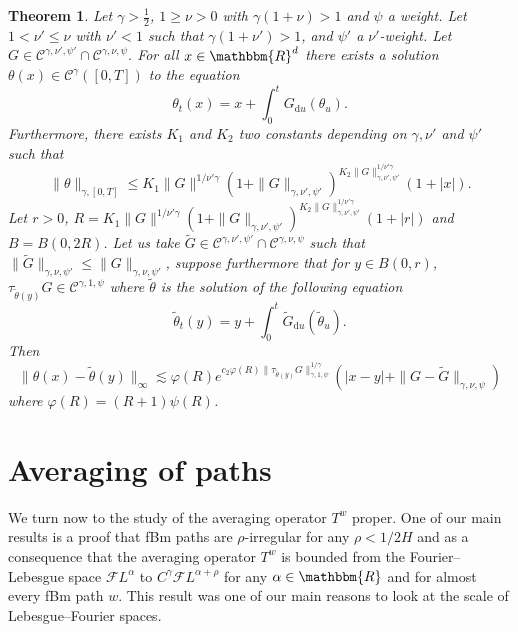 \documentclass[a4paper,11pt]{article}
\newcommand{\mathd}{\mathrm{d}}
\newtheorem{theorem}{Theorem}[section]
\newcommand{\CC}{\mathscr C}
\newcommand{\CF}{\mathscr F}
\begin{document}
\begin{theorem}
  Let $\gamma > \frac{1}{2}$, $1 \geqslant \nu >0$ with $\gamma ( 1+ \nu ) >1$
  and $\psi$ a weight. Let $1< \nu' \leqslant \nu$ with $\nu' <1$ such that
  $\gamma ( 1+ \nu' ) >1$, and $\psi'$ a $\nu'$-weight. Let $G \in \CC^{\gamma
  , \nu' , \psi'} \cap \CC^{\gamma , \nu , \psi}$. For all $x \in
  \mathbbm{R}^{d}$ there exists a solution $\theta ( x ) \in \CC^{\gamma} ( [
  0,T ] )$ to the equation
  \[ \theta_{t} ( x ) =x+ \int_{0}^{t} G_{\mathd u} ( \theta_{u} ) . \]
  Furthermore, there exists $K_{1}$ and $K_{2}$ two constants depending on
  $\gamma , \nu'$ and $\psi'$ such that
  \[ _{} \| \theta \|_{\gamma , [ 0,T ]} \leqslant K_{1} \| G \|^{1/ \nu'
     \gamma} ( 1+ \| G \|_{\gamma , \nu' , \psi'} )^{K_{2} \| G \|_{\gamma ,
     \nu' , \psi'}^{1/ \nu' \gamma}} ( 1+ | x | ) . \]
  Let $r>0$, $R=K_{1} \| G \|^{1/ \nu' \gamma} ( 1+ \| G \|_{\gamma , \nu' ,
  \psi'} )^{K_{2} \| G \|_{\gamma , \nu' , \psi'}^{1/ \nu' \gamma}} ( 1+ | r |
  )$ and $B=B ( 0,2R )$. Let us take $\tilde{G} \in \CC^{\gamma , \nu' ,
  \psi'} \cap \CC^{\gamma , \nu , \psi}$ such that $\| \tilde{G} \|_{\gamma ,
  \nu , \psi'} \leqslant \| G \|_{\gamma , \nu , \psi'}$, suppose furthermore
  that for $y \in B ( 0,r )$, $\tau_{\tilde{\theta} ( y )} G \in \CC^{\gamma
  ,1, \psi}$ where $\tilde{\theta}$ is the solution of the following equation
  \[ \tilde{\theta}_{t} ( y ) =y+ \int_{0}^{t} \tilde{G}_{\mathd u} (
     \tilde{\theta}_{u} ) . \]
  Then
  \[ \| \theta ( x ) - \tilde{\theta} ( y ) \|_{\infty} \lesssim \varphi ( R )
     e^{c_{2} \varphi ( R ) \| \tau_{\tilde{\theta} ( y )} G \|_{\gamma ,1,
     \psi}^{1/ \gamma}} ( | x-y | + \| G- \tilde{G} \|_{\gamma , \nu , \psi} )
  \]
  where $\varphi ( R ) = ( R+1 ) \psi ( R )$.
\end{theorem}

\section{Averaging of paths}\label{sec:averaging_deterministic}

We turn now to the study of the averaging operator $T^{w}$ proper. One of our
main results is a proof that fBm paths are $\rho$-irregular for any $\rho
<1/2H$ and as a consequence that the averaging operator $T^{w}$ is bounded
from the Fourier--Lebesgue space $\CF L^{\alpha}$ to $C^{\gamma} \CF L^{\alpha
+ \rho}$ for any $\alpha \in \mathbbm{R}$ and for almost every fBm path $w$.
This result was one of our main reasons to look at the scale of
Lebesgue--Fourier spaces.
\end{document}
